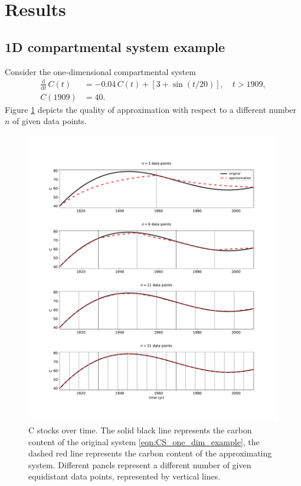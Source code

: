\documentclass[11pt,a4paper]{article}
\newcommand{\deriv}[1]{\frac{\mathrm{d}}{\mathrm{d}#1}}
\begin{document}
\section{Results}
\subsection{1D compartmental system example}
Consider the one-dimensional compartmental system
\begin{equation}\label{eqn:CS_one_dim_example}
    \begin{aligned}
        \deriv{t}\,C(t) &= -0.04\,C(t) + \left[3+\sin(t/20)\right],\quad t>1909,\\
        C(1909) &= 40.
    \end{aligned}
\end{equation}
Figure \ref{fig:CS_one_dim_example} depicts the quality of approximation with respect to a different number $n$ of given data points.
\begin{figure}[htbp]
    \centering 
    \includegraphics[width=1.0\linewidth]{figs/interpol_pwc_1.pdf}
    \caption{C stocks over time.
        The solid black line represents the carbon content of the original system \eqref{eqn:CS_one_dim_example}, the dashed red line represents the carbon content of the approximating system.
        Different panels represent a different number of given equidistant data points, represented by vertical lines.
        }
    \label{fig:CS_one_dim_example}
\end{figure}        
\end{document}
